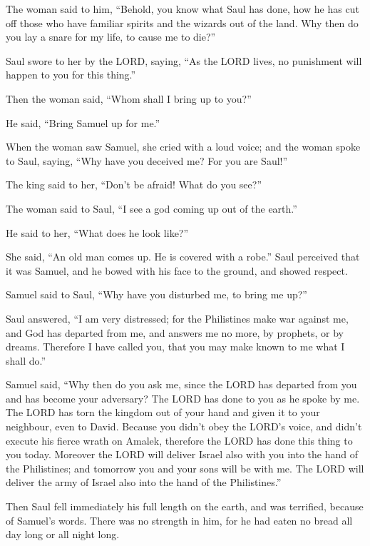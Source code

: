  The woman said to him, ``Behold, you know what Saul has
done, how he has cut off those who have familiar spirits and the wizards
out of the land. Why then do you lay a snare for my life, to cause me to
die?''

 Saul swore to her by the LORD, saying, ``As the LORD
lives, no punishment will happen to you for this thing.''

 Then the woman said, ``Whom shall I bring up to you?''

He said, ``Bring Samuel up for me.''

 When the woman saw Samuel, she cried with a loud voice;
and the woman spoke to Saul, saying, ``Why have you deceived me? For you
are Saul!''

 The king said to her, ``Don't be afraid! What do you
see?''

The woman said to Saul, ``I see a god coming up out of the earth.''

 He said to her, ``What does he look like?''

She said, ``An old man comes up. He is covered with a robe.'' Saul
perceived that it was Samuel, and he bowed with his face to the ground,
and showed respect.

 Samuel said to Saul, ``Why have you disturbed me, to bring
me up?''

Saul answered, ``I am very distressed; for the Philistines make war
against me, and God has departed from me, and answers me no more, by
prophets, or by dreams. Therefore I have called you, that you may make
known to me what I shall do.''

 Samuel said, ``Why then do you ask me, since the LORD has
departed from you and has become your adversary?  The LORD
has done to you as he spoke by me. The LORD has torn the kingdom out of
your hand and given it to your neighbour, even to David. 
Because you didn't obey the LORD's voice, and didn't execute his fierce
wrath on Amalek, therefore the LORD has done this thing to you today.
 Moreover the LORD will deliver Israel also with you into
the hand of the Philistines; and tomorrow you and your sons will be with
me. The LORD will deliver the army of Israel also into the hand of the
Philistines.''

 Then Saul fell immediately his full length on the earth,
and was terrified, because of Samuel's words. There was no strength in
him, for he had eaten no bread all day long or all night long.

